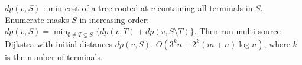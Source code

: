 $dp(v,S)$ : min cost of a tree rooted at $v$ containing all terminals in $S$.
Enumerate masks $S$ in increasing order:
$
dp(v,S)=\min_{\emptyset\neq T\subsetneq S}
\{dp(v,T)+dp(v,S\setminus T)\}.
$
Then run multi-source Dijkstra with initial distances $dp(v,S)$.
$O(3^k n+2^k(m+n)\log n)$, where $k$ is the number of terminals.